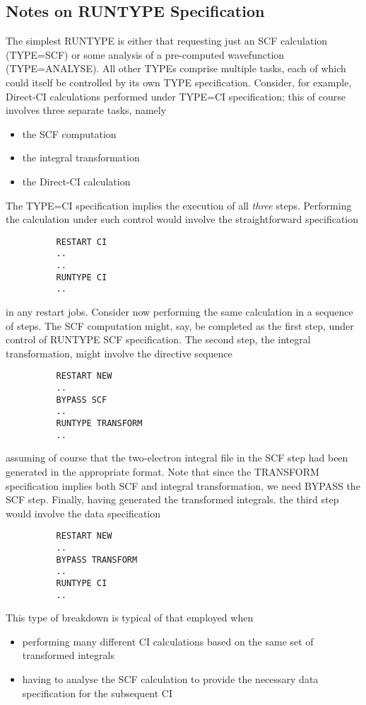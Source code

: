 \documentclass[11pt,fleqn]{article}
\begin{document}
\subsection[Notes on RUNTYPE Specification]{Notes on RUNTYPE Specification}

The simplest RUNTYPE is either that requesting just an SCF
calculation (TYPE=SCF) or some analysis of a pre-computed 
wavefunction (TYPE=ANALYSE). All other TYPEs comprise multiple tasks,
each of which could itself be controlled by its own TYPE
specification. Consider, for example, Direct-CI calculations 
performed under TYPE=CI specification; this of course involves
three separate tasks, namely
\begin{itemize}
\item the SCF computation
\item the integral transformation
\item the Direct-CI calculation
\end{itemize}
The TYPE=CI specification implies the execution of all {\em three}
steps. Performing the calculation under such control would
involve the straightforward specification

{
\footnotesize
\begin{verbatim}
          RESTART CI
          ..
          ..
          RUNTYPE CI
          ..
\end{verbatim}
}
in any restart jobs. Consider now performing the same calculation
in a sequence of steps. The SCF computation might, say, be completed
as the first step, under control of RUNTYPE SCF specification. The
second step, the integral transformation, might involve the
directive sequence

{
\footnotesize
\begin{verbatim}
          RESTART NEW
          ..
          BYPASS SCF
          ..
          RUNTYPE TRANSFORM
          ..
\end{verbatim}
}
assuming of course that the two-electron integral file in the
SCF step had been generated in the appropriate format. Note that
since the TRANSFORM specification implies both SCF and integral
transformation, we need BYPASS the SCF step. Finally, having
generated the transformed integrals. the third step would
involve the data specification

{
\footnotesize
\begin{verbatim}
          RESTART NEW
          ..
          BYPASS TRANSFORM
          ..
          RUNTYPE CI
          ..
\end{verbatim}
}
This type of breakdown is typical of that employed when
\begin{itemize}
\item performing many different CI calculations
based on the same set of transformed integrals
\item having to analyse the SCF calculation to provide
the necessary data specification for the subsequent CI
\end{itemize}
\end{document}
